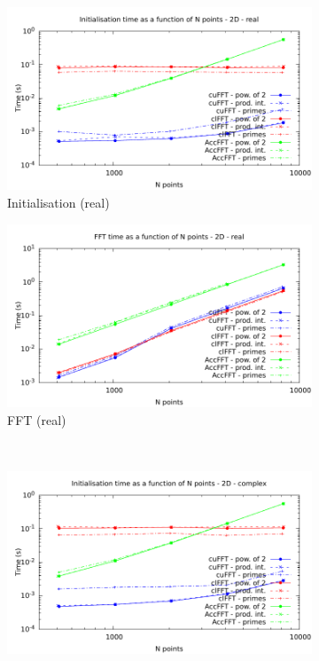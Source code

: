 \documentclass[12pt, a4paper]{article}
\begin{document}
\begin{figure}[htb]
\captionsetup{width=0.8\linewidth}
\centering
\begin{subfigure}{.5\textwidth}
\centering
\includegraphics[width=.9\linewidth]{graphs/fft-2d-r-init.pdf}
\caption{Initialisation (real)}
\label{FFT2DRI}
\end{subfigure}%
\begin{subfigure}{.5\textwidth}
\centering
\includegraphics[width=.9\linewidth]{graphs/fft-2d-r-exec.pdf}
\caption{FFT (real)}
\label{FFT2DRE}
\end{subfigure}\\
\begin{subfigure}{.5\textwidth}
\centering
\includegraphics[width=.9\linewidth]{graphs/fft-2d-c-init.pdf}

\end{subfigure}
\end{figure}
\end{document}
